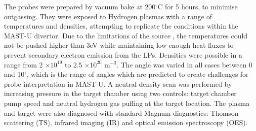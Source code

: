 \documentclass[a4paper, 11pt]{article} %
\begin{document}
	The probes were prepared by vacuum bake at 200$^{\circ}$C for 5 hours, to minimise outgassing. 
	They were exposed to Hydrogen plasmas with a range of temperatures and densities, attempting to replicate the conditions within the MAST-U divertor.
	Due to the limitations of the source \cite{DeTemmerman2015a}, the temperatures could not be pushed higher than 3eV while maintaining low enough heat fluxes to prevent secondary electron emission from the LPs\cite{Stangeby2000}. 
	Densities were possible in a range from 2 $\times 10^{19}$ to 2.5 $\times 10^{20}$ m$^{-3}$.
	The angle was varied in all cases between 0 and 10$^{\circ}$, which is the range of angles which are predicted to create challenges for probe interpretation in MAST-U.
	A neutral density scan was performed by increasing pressure in the target chamber using two controls: target chamber pump speed and neutral hydrogen gas puffing at the target location.	
	The plasma and target were also diagnosed with standard Magnum diagnostics: Thomson scattering (TS), infrared imaging (IR) and optical emission spectroscopy (OES). 
	
\end{document}

